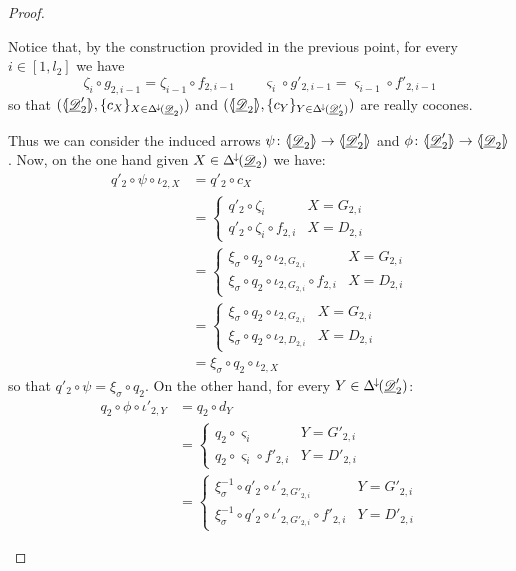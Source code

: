 \begin{proof}
\begin{enumerate}
		Notice that, by the construction provided in the previous point, for every $i\in [1, l_2]$ we have
		\[\zeta_i\circ g_{2, i-1}=\zeta_{i-1}\circ f_{2,i-1} \qquad \varsigma_i\circ g'_{2, i-1}=\varsigma_{i-1}\circ f'_{2,i-1} \]
		so that $(\langle \hspace{-1.85pt}[ \underline{\mathscr{D}}'_2]\hspace{-1.85pt}\rangle, \{c_X\}_{X\in \Delta^{\hspace{-1pt}\downarrow\hspace{-1pt}}(\underline{\mathscr{D}}_2)})$ and $(\langle \hspace{-1.85pt}[ \underline{\mathscr{D}}_2]\hspace{-1.85pt}\rangle, \{c_Y\}_{Y\in \Delta^{\hspace{-1pt}\downarrow\hspace{-1pt}}(\underline{\mathscr{D}}'_2)})$ are really cocones.
		
		Thus we can consider the induced arrows $\psi\colon \langle \hspace{-1.85pt}[ \underline{\mathscr{D}}_2]\hspace{-1.85pt}\rangle \to \langle \hspace{-1.85pt}[ \underline{\mathscr{D}}'_2]\hspace{-1.85pt}\rangle$ and $\phi\colon \langle \hspace{-1.85pt}[ \underline{\mathscr{D}}'_2]\hspace{-1.85pt}\rangle \to \langle \hspace{-1.85pt}[ \underline{\mathscr{D}}_2]\hspace{-1.85pt}\rangle$. Now, on the one hand given $X\in \Delta^{\hspace{-1pt}\downarrow\hspace{-1pt}}(\underline{\mathscr{D}}_2)$ we have:
		\begin{align*}
			q'_2\circ \psi \circ \iota_{2,X}&=q'_2\circ c_X\\&=\begin{cases}
				q'_2\circ  \zeta_i & X =G_{2,i}\\
				q'_2 \circ  \zeta_{i}\circ f_{2,i} & X={D_{2,i}}
			\end{cases}\\&=\begin{cases}
			\xi_\sigma \circ q_2\circ \iota_{2, G_{2,i}} & X =G_{2,i}\\
			\xi_\sigma \circ q_2\circ \iota_{2, G_{2,i}} \circ f_{2,i} & X={D_{2,i}}
			\end{cases}\\&=\begin{cases}
			\xi_\sigma \circ q_2\circ \iota_{2, G_{2,i}} & X =G_{2,i}\\
			\xi_\sigma \circ q_2\circ \iota_{2, D_{2,i}} & X={D_{2,i}}
			\end{cases}\\&= \xi_\sigma \circ q_2\circ \iota_{2, X}
		\end{align*}
		so that $q'_2\circ \psi = \xi_{\sigma} \circ q_2$. On the other hand, for every $Y\in \Delta^{\hspace{-1pt}\downarrow\hspace{-1pt}}(\underline{\mathscr{D}}'_2)$:
		\begin{align*}
	q_2\circ \phi \circ \iota'_{2,Y}&=q_2\circ d_Y\\&=\begin{cases}
		q_2\circ  \varsigma_i & Y =G'_{2,i}\\
		q_2 \circ \varsigma_{i}\circ f'_{2,i} & Y={D'_{2,i}}
	\end{cases}\\&=\begin{cases}
		\xi^{-1}_\sigma \circ q'_2\circ \iota'_{2, G'_{2,i}} & Y =G'_{2,i}\\
		\xi^{-1}_\sigma \circ q'_2\circ \iota'_{2, G'_{2,i}} \circ f'_{2,i} & Y={D'_{2,i}}

\end{cases}
\end{align*}
\end{enumerate}
\end{proof}
